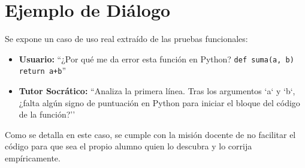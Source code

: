 \section{Ejemplo de Diálogo}
Se expone un caso de uso real extraído de las pruebas funcionales:
\begin{itemize}
    \item \textbf{Usuario:} ``¿Por qué me da error esta función en Python? \texttt{def suma(a, b) return a+b}''
    \item \textbf{Tutor Socrático:} ``Analiza la primera línea. Tras los argumentos `a` y `b`, ¿falta algún signo de puntuación en Python para iniciar el bloque del código de la función?''
\end{itemize}
Como se detalla en este caso, se cumple con la misión docente de no facilitar el código para que sea el propio alumno quien lo descubra y lo corrija empíricamente.
